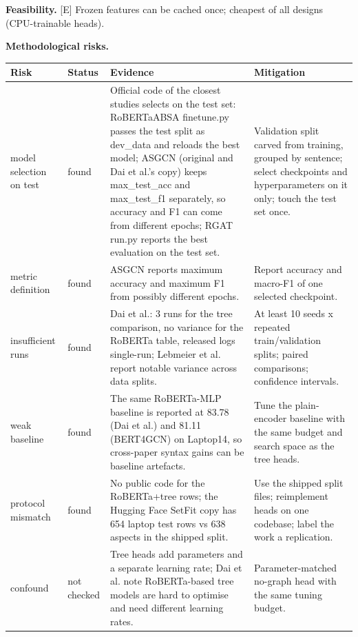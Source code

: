 \documentclass[11pt,a4paper]{article}
\begin{document}
\textbf{Feasibility.} [E] Frozen features can be cached once; cheapest of all designs (CPU-trainable heads).

\textbf{Methodological risks.}

{\small
\begin{longtable}{>{\raggedright\arraybackslash}p{}>{\raggedright\arraybackslash}p{}>{\raggedright\arraybackslash}p{}>{\raggedright\arraybackslash}p{}}
\toprule
\textbf{Risk} & \textbf{Status} & \textbf{Evidence} & \textbf{Mitigation} \\
\midrule
\endhead
model selection on test & found & [V] Official code of the closest studies selects on the test set: RoBERTaABSA finetune.py passes the test split as dev\_data and reloads the best model; ASGCN (original and Dai et al.'s copy) keeps max\_test\_acc and max\_test\_f1 separately, so accuracy and F1 can come from different epochs; RGAT run.py reports the best evaluation on the test set. \cite{dai2021syntax,zhang2019asgcn,wang2020rgat} & Validation split carved from training, grouped by sentence; select checkpoints and hyperparameters on it only; touch the test set once. \\
metric definition & found & [V] ASGCN reports maximum accuracy and maximum F1 from possibly different epochs. \cite{zhang2019asgcn} & Report accuracy and macro-F1 of one selected checkpoint. \\
insufficient runs & found & [V] Dai et al.: 3 runs for the tree comparison, no variance for the RoBERTa table, released logs single-run; Lebmeier et al. report notable variance across data splits. \cite{dai2021syntax,lebmeier2023repro} & At least 10 seeds x repeated train/validation splits; paired comparisons; confidence intervals. \\
weak baseline & found & [V] The same RoBERTa-MLP baseline is reported at 83.78 (Dai et al.) and 81.11 (BERT4GCN) on Laptop14, so cross-paper syntax gains can be baseline artefacts. \cite{dai2021syntax,xiao2021bert4gcn} & Tune the plain-encoder baseline with the same budget and search space as the tree heads. \\
protocol mismatch & found & [V] No public code for the RoBERTa+tree rows; the Hugging Face SetFit copy has 654 laptop test rows vs 638 aspects in the shipped split. \cite{dai2021syntax} & Use the shipped split files; reimplement heads on one codebase; label the work a replication. \\
confound & not checked & Tree heads add parameters and a separate learning rate; Dai et al. note RoBERTa-based tree models are hard to optimise and need different learning rates. & Parameter-matched no-graph head with the same tuning budget. \\

\end{longtable}}
\end{document}
